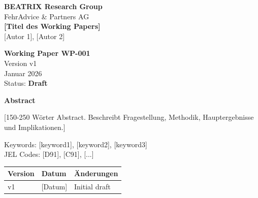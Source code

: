 \documentclass[12pt,a4paper]{article}
\newcommand{\WPNumber}{WP-001}
\newcommand{\WPVersion}{v1}
\newcommand{\WPDate}{Januar 2026}
\newcommand{\WPTitle}{[Titel des Working Papers]}
\newcommand{\WPAuthors}{[Autor 1], [Autor 2]}
\newcommand{\WPStatus}{Draft} %
\begin{document}

\begin{titlepage}
\begin{center}

\vspace*{2cm}

{\Large\textbf{BEATRIX Research Group}}\\[0.5cm]
{\large FehrAdvice \& Partners AG}\\[2cm]

{\huge\textbf{\WPTitle}}\\[1cm]

{\Large \WPAuthors}\\[2cm]

\begin{tcolorbox}[colback=blue!5!white, colframe=blue!75!black, width=8cm]
\centering
\textbf{Working Paper \WPNumber}\\
Version \WPVersion\\
\WPDate\\[0.5em]
Status: \textbf{\WPStatus}
\end{tcolorbox}

\vfill

{\small
\textbf{Abstract}\\[0.5em]
\begin{minipage}{0.8\textwidth}
[150-250 Wörter Abstract. Beschreibt Fragestellung, Methodik, 
Hauptergebnisse und Implikationen.]
\end{minipage}
}

\vspace{1cm}

{\footnotesize
Keywords: [keyword1], [keyword2], [keyword3]\\
JEL Codes: [D91], [C91], [...]
}

\end{center}
\end{titlepage}

\begin{tcolorbox}[colback=gray!5!white, colframe=gray!50!black, 
    title=\textbf{Version History}]
\begin{tabular}{@{}llp{8cm}@{}}
\toprule
\textbf{Version} & \textbf{Datum} & \textbf{Änderungen} \\
\midrule
v1 & [Datum] & Initial draft \\
\bottomrule
\end{tabular}
\end{tcolorbox}
\end{document}

